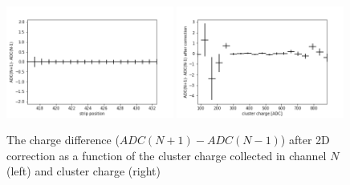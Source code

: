 \begin{figure}[h]
\begin{center}
\includegraphics[width = 0.49\textwidth]{figures/eta/difference_ac.png} 
\includegraphics[width = 0.49\textwidth]{figures/eta/difference_vs_charge_ac.png}
\caption{The charge difference ($ADC(N+1) - ADC(N-1)$) after 2D correction as a function of the cluster charge collected in channel $N$ (left) and cluster charge (right) }
\label{fig:after_correction}
 \end{center}
 \end{figure}


